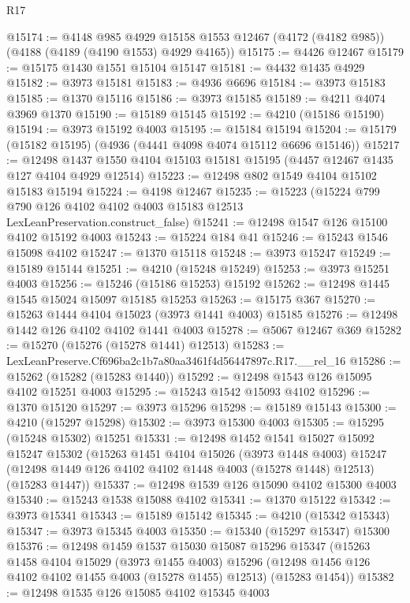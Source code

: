 \begin{lexlean}{R17}
\begin{coremodule}
@15174 := @4148
    @985
    @4929
    @15158
    @1553
    @12467
    (@4172 (@4182 @985))
    (@4188 (@4189 (@4190 @1553) @4929 @4165))
@15175 := @4426 @12467
@15179 := @15175 @1430 @1551 @15104 @15147
@15181 := @4432 @1435 @4929
@15182 := @3973 @15181
@15183 := @4936 @6696
@15184 := @3973 @15183
@15185 := @1370 @15116
@15186 := @3973 @15185
@15189 := @4211 @4074 @3969 @1370
@15190 := @15189 @15145
@15192 := @4210 (@15186 @15190)
@15194 := @3973 @15192 @4003
@15195 := @15184 @15194
@15204 := @15179 (@15182 @15195) (@4936 (@4441 @4098 @4074 @15112 @6696 @15146))
@15217 := @12498 @1437 @1550 @4104 @15103 @15181 @15195 (@4457 @12467 @1435 @127 @4104 @4929 @12514)
@15223 := @12498 @802 @1549 @4104 @15102 @15183 @15194
@15224 := @4198 @12467
@15235 := @15223
    (@15224 @799 @790 @126 @4102 @4102 @4003 @15183 @12513 LexLeanPreservation.construct_false)
@15241 := @12498 @1547 @126 @15100 @4102 @15192 @4003
@15243 := @15224 @184 @41
@15246 := @15243 @1546 @15098 @4102
@15247 := @1370 @15118
@15248 := @3973 @15247
@15249 := @15189 @15144
@15251 := @4210 (@15248 @15249)
@15253 := @3973 @15251 @4003
@15256 := @15246 (@15186 @15253) @15192
@15262 := @12498 @1445 @1545 @15024 @15097 @15185 @15253
@15263 := @15175 @367
@15270 := @15263 @1444 @4104 @15023 (@3973 @1441 @4003) @15185
@15276 := @12498 @1442 @126 @4102 @4102 @1441 @4003
@15278 := @5067 @12467 @369
@15282 := @15270 (@15276 (@15278 @1441) @12513)
@15283 := LexLeanPreserve.Cf696ba2c1b7a80aa3461f4d56447897c.R17.__rel_16
@15286 := @15262 (@15282 (@15283 @1440))
@15292 := @12498 @1543 @126 @15095 @4102 @15251 @4003
@15295 := @15243 @1542 @15093 @4102
@15296 := @1370 @15120
@15297 := @3973 @15296
@15298 := @15189 @15143
@15300 := @4210 (@15297 @15298)
@15302 := @3973 @15300 @4003
@15305 := @15295 (@15248 @15302) @15251
@15331 := @12498
    @1452
    @1541
    @15027
    @15092
    @15247
    @15302
    (@15263
      @1451
      @4104
      @15026
      (@3973 @1448 @4003)
      @15247
      (@12498 @1449 @126 @4102 @4102 @1448 @4003 (@15278 @1448) @12513)
      (@15283 @1447))
@15337 := @12498 @1539 @126 @15090 @4102 @15300 @4003
@15340 := @15243 @1538 @15088 @4102
@15341 := @1370 @15122
@15342 := @3973 @15341
@15343 := @15189 @15142
@15345 := @4210 (@15342 @15343)
@15347 := @3973 @15345 @4003
@15350 := @15340 (@15297 @15347) @15300
@15376 := @12498
    @1459
    @1537
    @15030
    @15087
    @15296
    @15347
    (@15263
      @1458
      @4104
      @15029
      (@3973 @1455 @4003)
      @15296
      (@12498 @1456 @126 @4102 @4102 @1455 @4003 (@15278 @1455) @12513)
      (@15283 @1454))
@15382 := @12498 @1535 @126 @15085 @4102 @15345 @4003

\end{coremodule}
\end{lexlean}
